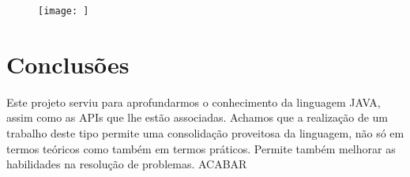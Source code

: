 \documentclass[a4paper]{article}
\begin{document}
\begin{figure}[htbp]
    \centering
    \texttt{[image: ]}
\end{figure}

\section{Conclusões}
\label{sec:conclusao}
Este projeto serviu para aprofundarmos o conhecimento da linguagem JAVA, assim como as APIs que lhe estão associadas. Achamos que a realização de um trabalho deste tipo permite uma consolidação proveitosa da linguagem, não só em termos teóricos como também em termos práticos. Permite também melhorar as habilidades na resolução de problemas. ACABAR
\end{document}

